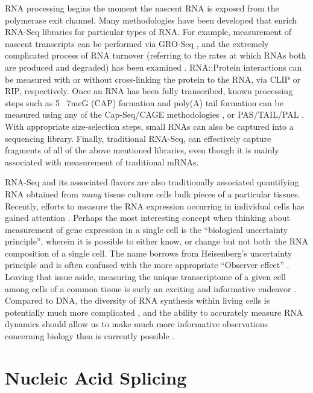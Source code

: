     RNA processing begins the moment the nascent RNA is exposed from the polymerase exit channel. Many methodologies have been developed that enrich RNA-Seq libraries for particular types of RNA. For example, measurement of nascent transcripts can be performed via GRO-Seq \citep{Core2008a}, and the extremely complicated process of RNA turnover (referring to the rates at which RNAs both are produced and degraded) has been examined \citep{Ghosh2010a, Tani2012}. RNA::Protein interactions can be measured with or without cross-linking the protein to the RNA, via CLIP or RIP, respectively. Once an RNA has been fully transcribed, known processing steps such as 5\textprime~ 7meG (CAP) formation and poly(A) tail formation can be measured using any of the Cap-Seq/CAGE methodologies \citep{Shiraki2003a}, or PAS/TAIL/PAL \citep{Shepard2011, Chang2014b, Subtelny2014}. With appropriate size-selection steps, small RNAs \citep{Ghildiyal2008} can also be captured into a sequencing library. Finally, traditional RNA-Seq, can effectively capture fragments of all of the above mentioned libraries, even though it is mainly associated with measurement of traditional mRNAs.

    RNA-Seq and its associated flavors are also traditionally associated quantifying RNA obtained from \textit{many} tissue culture cells bulk pieces of a particular tissues. Recently, efforts to measure the RNA expression occurring in individual cells has gained attention \citep{Shapiro2013b}. Perhaps the most interesting concept when thinking about measurement of gene expression in a single cell is the ``biological uncertainty principle'', wherein it is possible to either know, or change \textemdash but not both\textemdash~the RNA composition of a single cell. The name borrows from Heisenberg's uncertainty principle \citep{Kennard1927} and is often confused with the more appropriate ``Observer effect'' \citep{Riley2013}. Leaving that issue aside, measuring the unique transcriptome of a given cell among cells of a common tissue is surly an exciting and informative endeavor \citep{Marinov2013, Shalek2013b,Wills2013}. Compared to DNA, the diversity of RNA synthesis within living cells is potentially much more complicated \citep{Shendure2012}, and the ability to accurately measure RNA dynamics should allow us to make much more informative observations concerning biology then is currently possible \citep{Djebali2012}.

\section{Nucleic Acid Splicing}\label{hd: Nucleic Acid Splicing}

